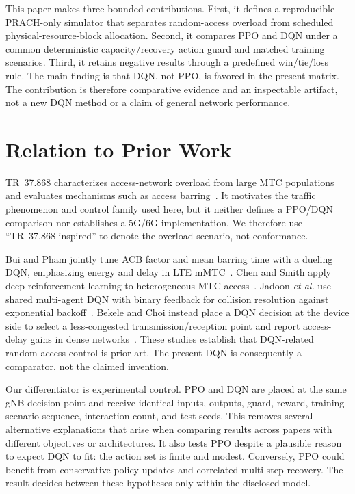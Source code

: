 \documentclass[conference]{IEEEtran}
\begin{document}
This paper makes three bounded contributions. First, it defines a reproducible PRACH-only simulator that separates random-access overload from scheduled physical-resource-block allocation. Second, it compares PPO and DQN under a common deterministic capacity/recovery action guard and matched training scenarios. Third, it retains negative results through a predefined win/tie/loss rule. The main finding is that DQN, not PPO, is favored in the present matrix. The contribution is therefore comparative evidence and an inspectable artifact, not a new DQN method or a claim of general network performance.

\section{Relation to Prior Work}
TR~37.868 characterizes access-network overload from large MTC populations and evaluates mechanisms such as access barring~\cite{tr37868}. It motivates the traffic phenomenon and control family used here, but it neither defines a PPO/DQN comparison nor establishes a 5G/6G implementation. We therefore use ``TR~37.868-inspired'' to denote the overload scenario, not conformance.

Bui and Pham jointly tune ACB factor and mean barring time with a dueling DQN, emphasizing energy and delay in LTE mMTC~\cite{bui2020}. Chen and Smith apply deep reinforcement learning to heterogeneous MTC access~\cite{chen2018}. Jadoon \emph{et al.} use shared multi-agent DQN with binary feedback for collision resolution against exponential backoff~\cite{jadoon2022}. Bekele and Choi instead place a DQN decision at the device side to select a less-congested transmission/reception point and report access-delay gains in dense networks~\cite{bekele2021}. These studies establish that DQN-related random-access control is prior art. The present DQN is consequently a comparator, not the claimed invention.

Our differentiator is experimental control. PPO and DQN are placed at the same gNB decision point and receive identical inputs, outputs, guard, reward, training scenario sequence, interaction count, and test seeds. This removes several alternative explanations that arise when comparing results across papers with different objectives or architectures. It also tests PPO despite a plausible reason to expect DQN to fit: the action set is finite and modest. Conversely, PPO could benefit from conservative policy updates and correlated multi-step recovery. The result decides between these hypotheses only within the disclosed model.
\end{document}
